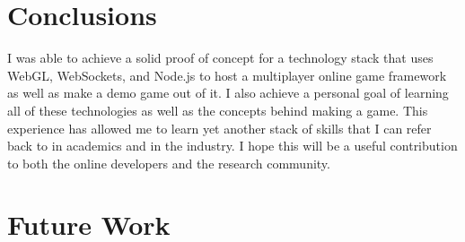 \documentclass{acmsiggraph}
\begin{document}
\section{Conclusions}
    I was able to achieve a solid proof of concept for a technology stack that uses WebGL, WebSockets, and Node.js to host a multiplayer online game framework as well as make a demo game out of it. I also achieve a personal goal of learning all of these technologies as well as the concepts behind making a game. This experience has allowed me to learn yet another stack of skills that I can refer back to in academics and in the industry. I hope this will be a useful contribution to both the online developers and the research community.

\section{Future Work}
\end{document}
